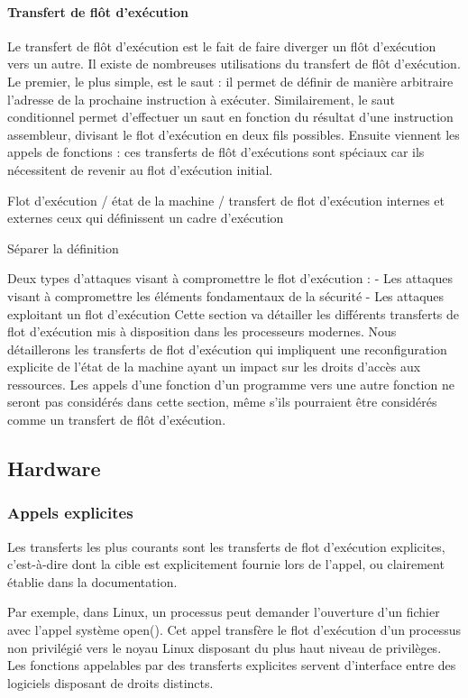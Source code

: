 		\paragraph{Transfert de flôt d'exécution}

			Le transfert de flôt d'exécution est le fait de faire diverger un flôt d'exécution vers un autre. Il existe de nombreuses utilisations du transfert de flôt d'exécution. Le premier, le plus simple, est le saut : il permet de définir de manière arbitraire l'adresse de la prochaine instruction à exécuter. Similairement, le saut conditionnel permet d'effectuer un saut en fonction du résultat d'une instruction assembleur, divisant le flot d'exécution en deux fils possibles. Ensuite viennent les appels de fonctions : ces transferts de flôt d'exécutions sont spéciaux car ils nécessitent de revenir au flot d'exécution initial. 


			Flot d'exécution / état de la machine / transfert de flot d'exécution internes et externes
			 ceux qui définissent un cadre d'exécution

			Séparer la définition 

			Deux types d'attaques visant à compromettre le flot d'exécution :
				- Les attaques visant à compromettre les éléments fondamentaux de la sécurité
				- Les attaques exploitant un flot d'exécution
		Cette section va détailler les différents transferts de flot d'exécution mis à disposition dans les processeurs modernes.
		Nous détaillerons les transferts de flot d'exécution qui impliquent une reconfiguration explicite de l'état de la machine ayant un impact sur les droits d'accès aux ressources. Les appels d'une fonction d'un programme vers une autre fonction ne seront pas considérés dans cette section, même s'ils pourraient être considérés comme un transfert de flôt d'exécution.


		\subsection{Hardware}

			\subsubsection{Appels explicites}
			Les transferts les plus courants sont les transferts de flot d'exécution explicites, c'est-à-dire dont la cible est explicitement fournie lors de l’appel, ou clairement établie dans la documentation.

Par exemple, dans Linux, un processus peut demander l’ouverture d’un fichier avec l’appel système open(). Cet appel transfère le flot d’exécution d’un processus non privilégié vers le noyau Linux disposant du plus haut niveau de privilèges. Les fonctions appelables par des transferts explicites servent d’interface entre des logiciels disposant de droits distincts.



